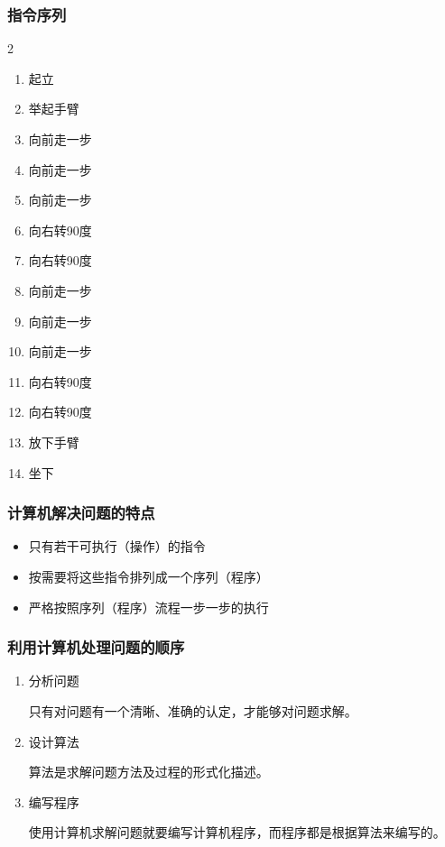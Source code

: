 \begin{frame}
    \frametitle{指令序列}
    \begin{multicols}{2}
        \begin{enumerate}
            \item 起立
            \item 举起手臂
            \item 向前走一步
            \item 向前走一步
            \item 向前走一步
            \item 向右转90度
            \item 向右转90度
            \item 向前走一步
            \item 向前走一步
            \item 向前走一步
            \item 向右转90度
            \item 向右转90度
            \item 放下手臂
            \item 坐下
        \end{enumerate}
    \end{multicols}
\end{frame}

\begin{frame}
    \frametitle{计算机解决问题的特点}
    \begin{itemize}
        \item 只有若干可执行（操作）的指令
        \item 按需要将这些指令排列成一个序列（程序）
        \item 严格按照序列（程序）流程一步一步的执行
    \end{itemize}
\end{frame}

\begin{frame}
    \frametitle{利用计算机处理问题的顺序}
    \begin{enumerate}
        \item 分析问题
        
        只有对问题有一个清晰、准确的认定，才能够对问题求解。
        \item 设计算法
        
        算法是求解问题方法及过程的形式化描述。
        \item 编写程序
        
        使用计算机求解问题就要编写计算机程序，而程序都是根据算法来编写的。
    \end{enumerate}
\end{frame}


